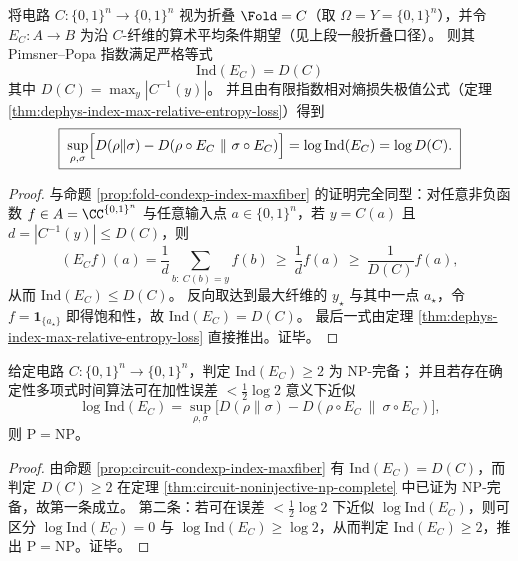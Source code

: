 \begin{proposition}[电路粗粒化条件期望的有限指数与最坏信息损失]\label{prop:circuit-condexp-index-maxfiber}
将电路 \(C:\{0,1\}^n\to\{0,1\}^n\) 视为折叠 \(\Fold=C\)（取 \(\Omega=Y=\{0,1\}^n\)），并令 \(E_C:A\to B\) 为沿 \(C\)-纤维的算术平均条件期望（见上段一般折叠口径）。
则其 Pimsner--Popa 指数满足严格等式
\[
\boxed{\;\mathrm{Ind}(E_C)=D(C)\;}
\]
其中 \(D(C)=\max_y |C^{-1}(y)|\)。
并且由有限指数相对熵损失极值公式（定理 \ref{thm:dephys-index-max-relative-entropy-loss}）得到
\[
\boxed{\;
\sup_{\rho,\sigma}\Bigl[D(\rho\|\sigma)-D(\rho\circ E_C\ \|\ \sigma\circ E_C)\Bigr]
=\log\mathrm{Ind}(E_C)=\log D(C).\;}
\]
\end{proposition}
\begin{proof}
与命题 \ref{prop:fold-condexp-index-maxfiber} 的证明完全同型：对任意非负函数 \(f\in A=\CC^{\{0,1\}^n}\) 与任意输入点 \(a\in\{0,1\}^n\)，若 \(y=C(a)\) 且 \(d=|C^{-1}(y)|\le D(C)\)，则
\[
(E_C f)(a)=\frac{1}{d}\sum_{b:\ C(b)=y}f(b)\ \ge\ \frac{1}{d}f(a)\ \ge\ \frac{1}{D(C)}f(a),
\]
从而 \(\mathrm{Ind}(E_C)\le D(C)\)。
反向取达到最大纤维的 \(y_\star\) 与其中一点 \(a_\star\)，令 \(f=\mathbf 1_{\{a_\star\}}\) 即得饱和性，故 \(\mathrm{Ind}(E_C)=D(C)\)。
最后一式由定理 \ref{thm:dephys-index-max-relative-entropy-loss} 直接推出。证毕。
\end{proof}

\begin{corollary}\label{cor:circuit-index-entropy-loss-np-hard}
给定电路 \(C:\{0,1\}^n\to\{0,1\}^n\)，判定 \(\mathrm{Ind}(E_C)\ge 2\) 为 \(\mathrm{NP}\)-完备；
并且若存在确定性多项式时间算法可在加性误差 \(<\tfrac12\log 2\) 意义下近似
\[
\log\mathrm{Ind}(E_C)=\sup_{\rho,\sigma}\bigl[D(\rho\|\sigma)-D(\rho\circ E_C\ \|\ \sigma\circ E_C)\bigr],
\]
则 \(\mathrm{P}=\mathrm{NP}\)。
\end{corollary}
\begin{proof}
由命题 \ref{prop:circuit-condexp-index-maxfiber} 有 \(\mathrm{Ind}(E_C)=D(C)\)，而判定 \(D(C)\ge 2\) 在定理 \ref{thm:circuit-noninjective-np-complete} 中已证为 \(\mathrm{NP}\)-完备，故第一条成立。
第二条：若可在误差 \(<\tfrac12\log 2\) 下近似 \(\log\mathrm{Ind}(E_C)\)，则可区分
\(
\log\mathrm{Ind}(E_C)=0
\)
与
\(
\log\mathrm{Ind}(E_C)\ge \log 2
\)，从而判定 \(\mathrm{Ind}(E_C)\ge 2\)，推出 \(\mathrm{P}=\mathrm{NP}\)。证毕。
\end{proof}

